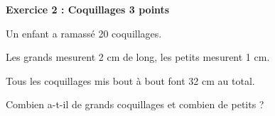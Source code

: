 \textbf{Exercice 2 : Coquillages \hfill 3 points}

\bigskip

Un enfant a ramassé 20 coquillages.
 
Les grands mesurent 2 cm de long, les petits mesurent 1 cm.

Tous les coquillages mis bout à bout font 32 cm au total. 
 
Combien a-t-il de grands coquillages et combien de petits ?

\bigskip 

